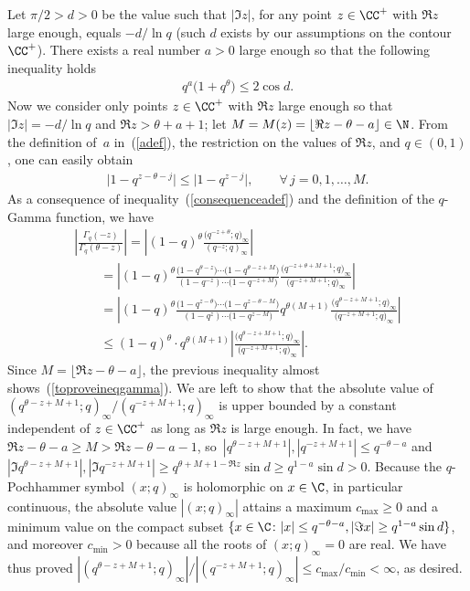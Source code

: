 Let $\pi/2 > d>0$ be the value such that $|\Im z|$, for any point $z\in\CC^+$ with $\Re z$ large enough, equals $-d/\ln{q}$ (such $d$ exists by our assumptions on the contour $\CC^+$). There exists a real number $a > 0$ large enough so that the following inequality holds
\begin{gather}\label{adef}
q^a\big(1 + q^{\theta}\big) \leq 2 \cos d.
\end{gather}
Now we consider only points $z\in\CC^+$ with $\Re z$ large enough so that $|\Im z| = -d/\ln{q}$ and $\Re z > \theta + a + 1$; let $M = M(z) = \lfloor \Re z - \theta - a \rfloor \in\N$. From the def\/inition of~$a$ in~(\ref{adef}), the restriction on the values of $\Re z$, and $q\in (0, 1)$, one can easily obtain
\begin{gather}\label{consequenceadef}
\big|1 - q^{z - \theta - j}\big| \leq \big|1 - q^{z - j}\big|, \qquad \forall\, j = 0, 1, \dots, M.
\end{gather}
As a consequence of inequality~(\ref{consequenceadef}) and the def\/inition of the $q$-Gamma function, we have
\begin{gather*}
\left| \frac{\Gamma_q(-z)}{\Gamma_q(\theta - z)} \right| = \left| (1 - q)^{\theta}\frac{\big(q^{-z+\theta}; q\big)_{\infty}}{(q^{-z}; q)_{\infty}} \right|\\
 \qquad{} = \left| (1 - q)^{\theta}\frac{\big(1 - q^{\theta - z}\big)\cdots \big(1 - q^{\theta - z + M}\big)}{(1 - q^{-z})\cdots\big(1 - q^{-z+M}\big)}\frac{\big(q^{-z+\theta+M+1}; q\big)_{\infty}}{\big(q^{-z+M+1}; q\big)_{\infty}} \right|\\
\qquad{} = \left| (1 - q)^{\theta}\frac{\big(1 - q^{z - \theta}\big)\cdots\big(1 - q^{z - \theta - M}\big)}{(1 - q^z)\cdots \big(1 - q^{z-M}\big)}q^{\theta(M+1)}\frac{\big(q^{\theta - z + M + 1}; q\big)_{\infty}}{\big(q^{-z+M+1}; q\big)_{\infty}} \right|\\
\qquad{} \leq (1 - q)^{\theta}\cdot q^{\theta(M+1)} \left| \frac{\big(q^{\theta-z+M+1}; q\big)_{\infty}}{\big(q^{-z+M+1}; q\big)_{\infty}} \right|.
\end{gather*}
Since $M = \lfloor \Re z - \theta - a\rfloor$, the previous inequality almost shows~(\ref{toproveineqgamma}).
We are left to show that the absolute value of $(q^{\theta-z+M+1}; q)_{\infty}/(q^{-z+M+1}; q)_{\infty}$ is upper bounded by a constant independent of $z\in\CC^+$ as long as $\Re z$ is large enough.
In fact, we have $\Re z - \theta - a\geq M > \Re z - \theta - a - 1$, so~$|q^{\theta-z+M+1}|, |q^{-z+M+1}|\leq q^{-\theta-a}$ and $|\Im q^{\theta - z + M + 1}|, |\Im q^{-z+M+1}| \geq q^{\theta + M + 1 - \Re z}\sin d \geq q^{1-a}\sin d > 0$. Because the $q$-Pochhammer symbol $(x; q)_{\infty}$ is holomorphic on $x\in\C$, in particular continuous, the absolute value $|(x; q)_{\infty}|$ attains a maximum $c_{\max}\geq 0$ and a minimum value  on the compact subset $\{x\in\C\colon |x| \leq q^{-\theta-a}, |\Im x| \geq q^{1-a}\sin d\}$, and moreover $c_{\min} > 0$ because all the roots of $(x; q)_{\infty} = 0$ are real. We have thus proved $|(q^{\theta-z+M+1}; q)_{\infty}|/|(q^{-z+M+1}; q)_{\infty}| \leq c_{\max}/c_{\min} < \infty$, as desired.

